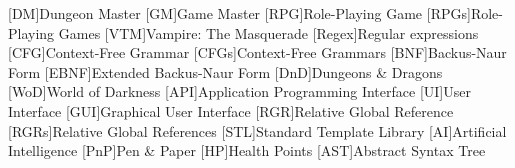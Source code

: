 [DM]{Dungeon Master}
[GM]{Game Master}
[RPG]{Role-Playing Game}
[RPGs]{Role-Playing Games}
[VTM]{Vampire: The Masquerade}
[Regex]{Regular expressions}
[CFG]{Context-Free Grammar}
[CFGs]{Context-Free Grammars}
[BNF]{Backus-Naur Form}
[EBNF]{Extended Backus-Naur Form}
[DnD]{Dungeons \& Dragons}
[WoD]{World of Darkness}
[API]{Application Programming Interface}
[UI]{User Interface}
[GUI]{Graphical User Interface}
[RGR]{Relative Global Reference}
[RGRs]{Relative Global References}
[STL]{Standard Template Library}
[AI]{Artificial Intelligence}
[PnP]{Pen \& Paper}
[HP]{Health Points}
[AST]{Abstract Syntax Tree}
